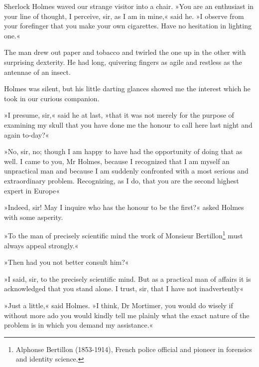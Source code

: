 Sherlock Holmes waved our strange visitor into a chair. »You are an enthusiast in your line of thought, I perceive, sir, as I am in mine,« said he. »I observe from your forefinger that you make your own cigarettes. Have no hesitation in lighting one.«

The man drew out paper and tobacco and twirled the one up in the other with surprising dexterity. He had long, quivering fingers as agile and restless as the antennae of an insect.

Holmes was silent, but his little darting glances showed me the interest which he took in our curious companion.

»I presume, sir,« said he at last, »that it was not merely for the purpose of examining my skull that you have done me the honour to call here last night and again to-day?«

»No, sir, no; though I am happy to have had the opportunity of doing that as well. I came to you, Mr Holmes, because I recognized that I am myself an unpractical man and because I am suddenly confronted with a most serious and extraordinary problem. Recognizing, as I do, that you are the second highest expert in Europe\longdash «

»Indeed, sir! May I inquire who has the honour to be the first?« asked Holmes with some asperity.

»To the man of precisely scientific mind the work of Monsieur Bertillon\footnote{Alphonse Bertillon (1853-1914), French police official and pioneer in forensics and identity science.} must always appeal strongly.«

»Then had you not better consult him?«

»I said, sir, to the precisely scientific mind. But as a practical man of affairs it is acknowledged that you stand alone. I trust, sir, that I have not inadvertently\longdash «

»Just a little,« said Holmes. »I think, Dr Mortimer, you would do wisely if without more ado you would kindly tell me plainly what the exact nature of the problem is in which you demand my assistance.«
